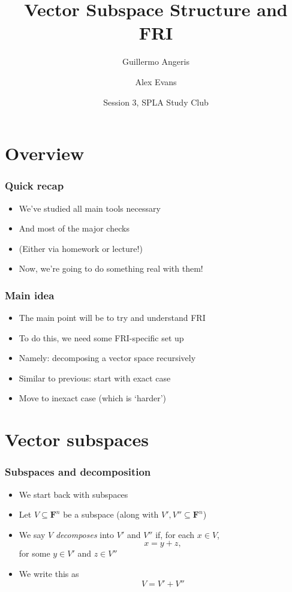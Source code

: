\documentclass{beamer}
\title{Vector Subspace Structure and FRI}
\author{Guillermo Angeris \and Alex Evans}
\date{Session 3, SPLA Study Club}
\newcommand{\field}{\mathbf{F}}
\begin{document}
	\begin{frame}
		\titlepage
	\end{frame}
	
    \section{Overview}
    \begin{frame}
        \frametitle{Quick recap}
        \begin{itemize}\itemsep=12pt
            \item We've studied all main tools necessary
            \item And most of the major checks
            \item (Either via homework or lecture!)
            \item Now, we're going to do something real with them!
        \end{itemize}
	\end{frame}

    \begin{frame}
        \frametitle{Main idea}
        \begin{itemize}\itemsep=12pt
            \item The main point will be to try and understand FRI
            \item To do this, we need some FRI-specific set up
            \item Namely: decomposing a vector space recursively
            \pause
            \item Similar to previous: start with exact case
            \item Move to inexact case (which is `harder')
        \end{itemize}
	\end{frame}

    \section{Vector subspaces}
    \begin{frame}
        \frametitle{Subspaces and decomposition}
        \begin{itemize}\itemsep=12pt
            \item We start back with subspaces
            \item Let $V \subseteq \field^n$ be a subspace (along with $V', V'' \subseteq \field^n$)
            \item We say $V$ \emph{decomposes} into $V'$ and $V''$ if, for each $x \in V$,
            \[
                x = y + z,
            \]
            for some $y \in V'$ and $z \in V''$
            \item We write this as
            \[
                V = V' + V''
            \]
        \end{itemize}
	\end{frame}
\end{document}
